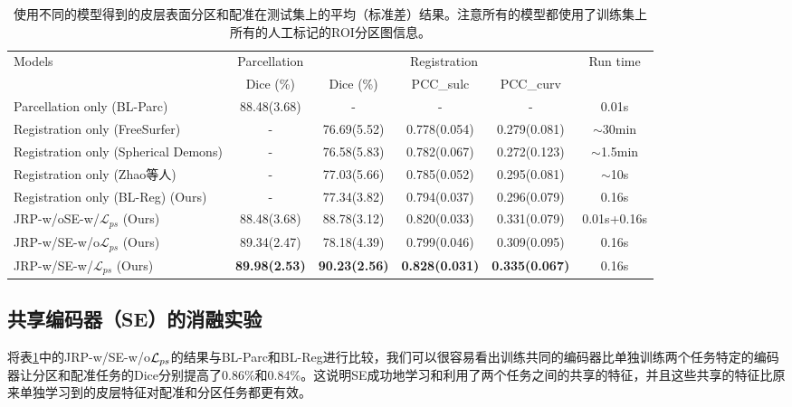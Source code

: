\begin{table}[t]
	\caption{使用不同的模型得到的皮层表面分区和配准在测试集上的平均（标准差）结果。注意所有的模型都使用了训练集上所有的人工标记的ROI分区图信息。}\label{tab:同时配准和分区的结果}
	\centering
		\begin{tabular}{l|c|ccc|c}
			\hline
			\multicolumn{1}{l|}{\multirow{2}{*}{Models}} & Parcellation & \multicolumn{3}{c|}{Registration}              & \multirow{2}{*}{Run time} \\ \cline{2-5}
			\multicolumn{1}{c|}{}                        & Dice (\%)        & Dice (\%)        & PCC\_sulc        & PCC\_curv       &                           \\ \hline
			Parcellation only (BL-Parc)                & 88.48(3.68)   & -           & -               & -              & 0.01s                     \\ \hline
			Registration only (FreeSurfer\cite{fischl1999high})        & -            & 76.69(5.52) & 0.778(0.054)  & 0.279(0.081) & $\sim$30min               \\ \hline
			Registration only (Spherical Demons\cite{yeo2009spherical})  & -            & 76.58(5.83) & 0.782(0.067)  & 0.272(0.123) & $\sim$1.5min              \\ \hline
			Registration only (Zhao等人\cite{zhao2020unsupervised})        & -            & 77.03(5.66) & 0.785(0.052)  & 0.295(0.081) & $\sim$10s                       \\ \hline
			Registration only (BL-Reg) (Ours)                & -            & 77.34(3.82) & 0.794(0.037) & 0.296(0.079) & 0.16s                     \\ \hline
			JRP-w/oSE-w/${\mathcal{L}}_{ps}$ (Ours)      & 88.48(3.68)  & 88.78(3.12) & 0.820(0.033)   & 0.331(0.079) &	0.01s+0.16s                     \\ \hline
			JRP-w/SE-w/o${\mathcal{L}}_{ps}$ (Ours)      &  89.34(2.47) & 78.18(4.39)  & 0.799(0.046)   &	0.309(0.095) &	0.16s                        \\ \hline
			JRP-w/SE-w/${\mathcal{L}}_{ps}$ (Ours)      &   \textbf{89.98(2.53)} &  \textbf{90.23(2.56)}  & \textbf{0.828(0.031)}   &	\textbf{0.335(0.067)} &	0.16s      \\ \hline
		\end{tabular}
\end{table}


\subsection{共享编码器（SE）的消融实验}
将表\ref{tab:同时配准和分区的结果}中的JRP-w/SE-w/o${\cal L}_{ps}$的结果与BL-Parc和BL-Reg进行比较，我们可以很容易看出训练共同的编码器比单独训练两个任务特定的编码器让分区和配准任务的Dice分别提高了0.86\%和0.84\%。这说明SE成功地学习和利用了两个任务之间的共享的特征，并且这些共享的特征比原来单独学习到的皮层特征对配准和分区任务都更有效。


